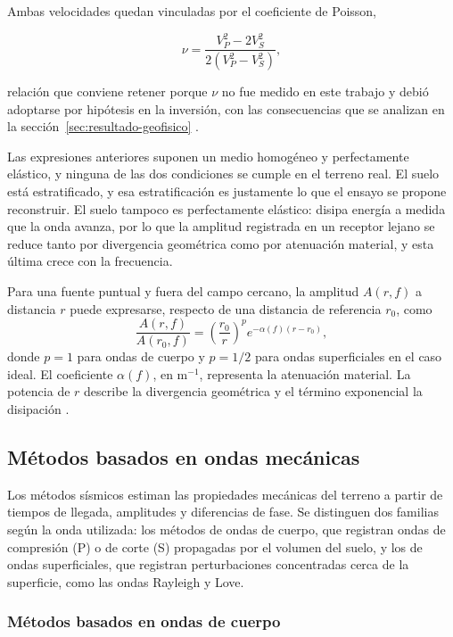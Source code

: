 Ambas velocidades quedan vinculadas por el coeficiente de Poisson,

\begin{equation}
\nu=\frac{V_P^{2}-2V_S^{2}}{2\left(V_P^{2}-V_S^{2}\right)},
\end{equation}

relación que conviene retener porque $\nu$ no fue medido en este trabajo y debió adoptarse por hipótesis en la inversión, con las consecuencias que se analizan en la sección~\ref{sec:resultado-geofisico} .

Las expresiones anteriores suponen un medio homogéneo y perfectamente elástico, y ninguna de las dos condiciones se cumple en el terreno real. El suelo está estratificado, y esa estratificación es justamente lo que el ensayo se propone reconstruir. El suelo tampoco es perfectamente elástico: disipa energía a medida que la onda avanza, por lo que la amplitud registrada en un receptor lejano se reduce tanto por divergencia geométrica como por atenuación material, y esta última crece con la frecuencia.

Para una fuente puntual y fuera del campo cercano, la amplitud $A(r,f)$ a distancia $r$ puede expresarse, respecto de una distancia de referencia $r_0$, como
\begin{equation}
\frac{A(r,f)}{A(r_0,f)}
=\left(\frac{r_0}{r}\right)^p e^{-\alpha(f)(r-r_0)},
\label{eq:atenuacion}
\end{equation}
donde $p=1$ para ondas de cuerpo y $p=1/2$ para ondas superficiales en el caso ideal. El coeficiente $\alpha(f)$, en m$^{-1}$, representa la atenuación material. La potencia de $r$ describe la divergencia geométrica y el término exponencial la disipación .

\subsection{Métodos basados en ondas mecánicas}
\label{sec:metodos-ondas}

Los métodos sísmicos estiman las propiedades mecánicas del terreno a partir de tiempos de llegada, amplitudes y diferencias de fase. Se distinguen dos familias según la onda utilizada: los métodos de ondas de cuerpo, que registran ondas de compresión (P) o de corte (S) propagadas por el volumen del suelo, y los de ondas superficiales, que registran perturbaciones concentradas cerca de la superficie, como las ondas Rayleigh y Love.

\subsubsection{Métodos basados en ondas de cuerpo}

